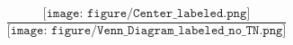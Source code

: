 \documentclass[12pt]{report}
\begin{document}
\begin{equation*}
\frac{\texttt{[image: figure/Center\_labeled.png]}}{\texttt{[image: figure/Venn\_Diagram\_labeled\_no\_TN.png]}}
\end{equation*}
\end{document}

